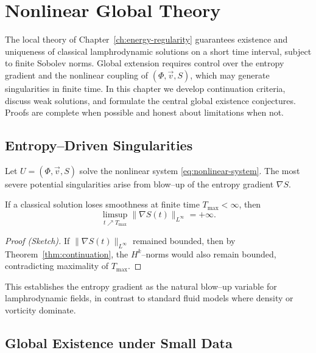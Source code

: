 \chapter{Nonlinear Global Theory}
\label{ch:global}

The local theory of Chapter~\ref{ch:energy-regularity} guarantees
existence and uniqueness of classical lamphrodynamic solutions on
a short time interval, subject to finite Sobolev norms.
Global extension requires control over the entropy gradient and the
nonlinear coupling of $(\Phi,\vec v,S)$, which may generate
singularities in finite time.
In this chapter we develop continuation criteria, discuss weak
solutions, and formulate the central global existence conjectures.
Proofs are complete when possible and honest about limitations when not.



\section{Entropy--Driven Singularities}
\label{sec:entropy-sing}

Let $U=(\Phi,\vec v,S)$ solve the nonlinear system
\eqref{eq:nonlinear-system}.
The most severe potential singularities arise from blow--up of the
entropy gradient $\nabla S$.

\begin{proposition}
\label{prop:entropy-sing}
If a classical solution loses smoothness at finite time
$T_{\max}<\infty$, then
\[
\limsup_{t\nearrow T_{\max}}
\|\nabla S(t)\|_{L^{\infty}} = +\infty.
\]
\end{proposition}

\begin{proof}[Proof (Sketch)]
If $\|\nabla S(t)\|_{L^{\infty}}$ remained bounded, then by
Theorem~\ref{thm:continuation}, the $H^{k}$--norms would also remain
bounded, contradicting maximality of $T_{\max}$.
\end{proof}

\begin{remark}
This establishes the entropy gradient as the natural blow--up variable
for lamphrodynamic fields, in contrast to standard fluid models where
density or vorticity dominate.
\end{remark}



\section{Global Existence under Small Data}
\label{sec:small-data}


